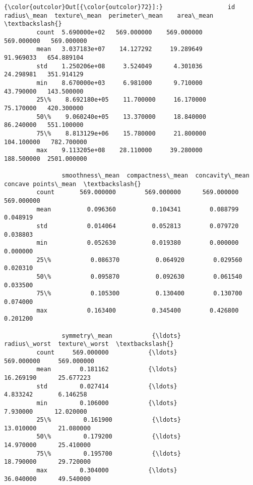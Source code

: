 \documentclass[11pt]{article}
\begin{document}
\begin{Verbatim}[commandchars=\\\{\}]
{\color{outcolor}Out[{\color{outcolor}72}]:}                  id  radius\_mean  texture\_mean  perimeter\_mean    area\_mean  \textbackslash{}
         count  5.690000e+02   569.000000    569.000000      569.000000   569.000000   
         mean   3.037183e+07    14.127292     19.289649       91.969033   654.889104   
         std    1.250206e+08     3.524049      4.301036       24.298981   351.914129   
         min    8.670000e+03     6.981000      9.710000       43.790000   143.500000   
         25\%    8.692180e+05    11.700000     16.170000       75.170000   420.300000   
         50\%    9.060240e+05    13.370000     18.840000       86.240000   551.100000   
         75\%    8.813129e+06    15.780000     21.800000      104.100000   782.700000   
         max    9.113205e+08    28.110000     39.280000      188.500000  2501.000000   
         
                smoothness\_mean  compactness\_mean  concavity\_mean  concave points\_mean  \textbackslash{}
         count       569.000000        569.000000      569.000000           569.000000   
         mean          0.096360          0.104341        0.088799             0.048919   
         std           0.014064          0.052813        0.079720             0.038803   
         min           0.052630          0.019380        0.000000             0.000000   
         25\%           0.086370          0.064920        0.029560             0.020310   
         50\%           0.095870          0.092630        0.061540             0.033500   
         75\%           0.105300          0.130400        0.130700             0.074000   
         max           0.163400          0.345400        0.426800             0.201200   
         
                symmetry\_mean           {\ldots}             radius\_worst  texture\_worst  \textbackslash{}
         count     569.000000           {\ldots}               569.000000     569.000000   
         mean        0.181162           {\ldots}                16.269190      25.677223   
         std         0.027414           {\ldots}                 4.833242       6.146258   
         min         0.106000           {\ldots}                 7.930000      12.020000   
         25\%         0.161900           {\ldots}                13.010000      21.080000   
         50\%         0.179200           {\ldots}                14.970000      25.410000   
         75\%         0.195700           {\ldots}                18.790000      29.720000   
         max         0.304000           {\ldots}                36.040000      49.540000   
         

\end{Verbatim}
\end{document}
